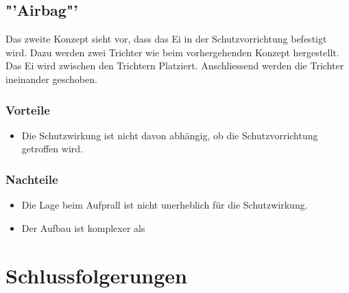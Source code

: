 \documentclass[a4paper,10pt,fleqn]{article}
\begin{document}
\subsection{"'Airbag"'}
Das zweite Konzept sieht vor, dass das Ei in der Schutzvorrichtung befestigt 
wird. Dazu werden zwei Trichter wie beim vorhergehenden Konzept hergestellt. 
Das Ei wird zwischen den Trichtern Platziert. Anschliessend werden die 
Trichter ineinander geschoben. 

\subsubsection*{Vorteile}
\begin{itemize}
  \item Die Schutzwirkung ist nicht davon abhängig, ob die Schutzvorrichtung 
        getroffen wird. 
\end{itemize}

\subsubsection*{Nachteile}
\begin{itemize}
  \item Die Lage beim Aufprall ist nicht unerheblich für die Schutzwirkung. 
  \item Der Aufbau ist komplexer als 
\end{itemize}




\section{Schlussfolgerungen}


{}
\end{document}
